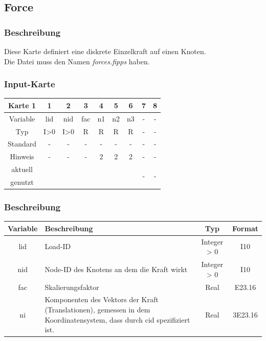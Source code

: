 \documentclass[11pt,titlepage,listof=totoc,bibliography=totoc,twoside]{scrreprt}
\begin{document}
{{\newpage

\subsection{Force}

\subsubsection{Beschreibung}

Diese Karte definiert eine diskrete Einzelkraft auf einen Knoten.\\
Die Datei muss den Namen \emph{forces.fipps} haben.

\subsubsection{Input-Karte}

\begin{table}[htbp]
\centering
\begin{tabularx}{\textwidth}{cCCCCCCCC}
\toprule
Karte 1	& 1		& 2		& 3		& 4		& 5		& 6		& 7	& 8	\\
\midrule
Variable& lid		& nid		& fac		& n1		& n2		& n3		& -	& -	\\
Typ	& I>0		& I>0		& R		& R		& R		& R		& -	& -	\\
Standard& -		& -		& -		& -		& -		& -		& -	& -	\\
Hinweis	& -		& -		& -		& 2		& 2		& 2		& -	& -	\\
aktuell	& 	& 	& 	& 	& 	& 	& \multirow{2}{*}{-}	& 	\\
genutzt \\
\bottomrule
\end{tabularx}
\end{table}

\subsubsection{Beschreibung}

\begin{tabularx}{\textwidth}{cXcc}
\toprule
Variable& Beschreibung																& Typ		& Format\\
\midrule
lid		& Load-ID															& Integer > 0	& I10	\\
nid		& Node-ID des Knotens an dem die Kraft wirkt											& Integer > 0	& I10	\\
fac		& Skalierungsfaktor														& Real		& E23.16\\
ni		& Komponenten des Vektors der Kraft (Translationen), gemessen in dem Koordinatensystem, dass durch cid spezifiziert ist.	& Real		& 3E23.16\\
\bottomrule
\end{tabularx}

}}
\end{document}
